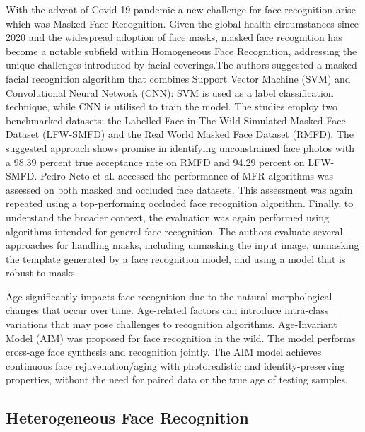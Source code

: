 With the advent of Covid-19 pandemic a new challenge for face recognition arise which was Masked Face Recognition. Given the global health circumstances since 2020 and the widespread adoption of face masks, masked face recognition has become a notable subfield within Homogeneous Face Recognition, addressing the unique challenges introduced by facial coverings.The authors \cite{9914874} suggested a masked facial recognition algorithm that combines Support Vector Machine (SVM) and Convolutional Neural Network (CNN): SVM is used as a label classification technique, while CNN is utilised to train the model. The studies employ two benchmarked datasets: the Labelled Face in The Wild Simulated Masked Face Dataset (LFW-SMFD) and the Real World Masked Face Dataset (RMFD). The suggested approach shows promise in identifying unconstrained face photos with a 98.39 percent true acceptance rate on RMFD and 94.29 percent on LFW-SMFD. Pedro Neto et al. \cite{pedro_neto_beyond_2022} accessed the performance of MFR algorithms was assessed on both masked and occluded face datasets. This assessment was again repeated using a top-performing occluded face recognition algorithm. Finally, to understand the broader context, the evaluation was again performed using algorithms intended for general face recognition. The authors evaluate several approaches for handling masks, including unmasking the input image, unmasking the template generated by a face recognition model, and using a model that is robust to masks.

Age significantly impacts face recognition due to the natural morphological changes that occur over time. Age-related factors can introduce intra-class variations that may pose challenges to recognition algorithms. Age-Invariant Model (AIM) \cite{zhao_towards_2022} was proposed for face recognition in the wild. The model performs cross-age face synthesis and recognition jointly. The AIM model achieves continuous face rejuvenation/aging with photorealistic and identity-preserving properties, without the need for paired data or the true age of testing samples.

\subsection{Heterogeneous Face Recognition}


